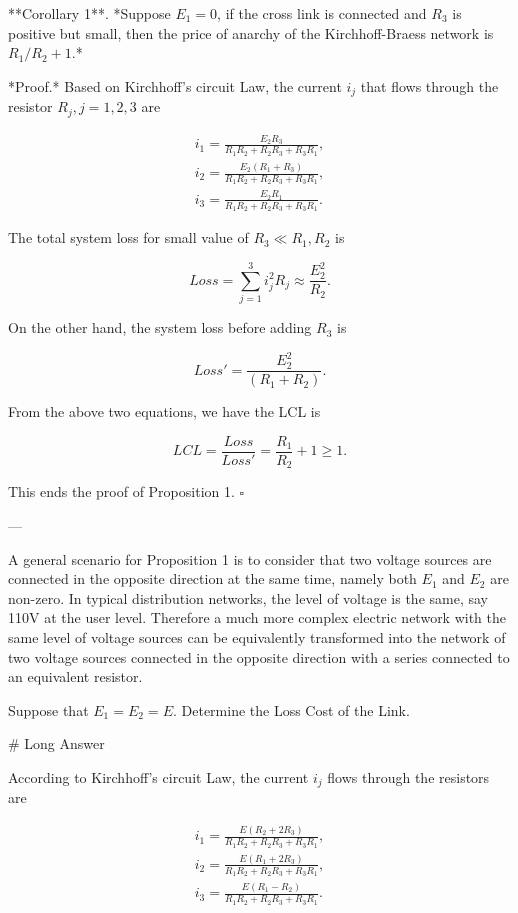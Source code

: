 **Corollary 1**. *Suppose $E_1=0$, if the cross link is connected and $R_3$ is positive but small, then the price of anarchy of the Kirchhoff-Braess network is $R_1/R_2 + 1.$*

*Proof.* Based on Kirchhoff's circuit Law, the current $i_j$ that flows through the resistor $R_j,j=1,2,3$ are

$$\begin{aligned} i_1 = \frac{E_2 R_3}{R_1R_2+R_2R_3+R_3R_1},\nonumber\\ i_2 = \frac{E_2 (R_1+R_3)}{R_1R_2+R_2R_3+R_3R_1},\nonumber\\ i_3 = \frac{E_2 R_1}{R_1R_2+R_2R_3+R_3R_1}.\nonumber \end{aligned}$$

The total system loss for small value of $R_3 \ll R_1,R_2$ is

$$Loss = \sum_{j=1}^{3} i_j^2R_j \approx \frac{E_2^2}{R_2}.$$

On the other hand, the system loss before adding $R_3$ is

$$Loss' = \frac{E_2^2}{(R_1+R_2)}.$$

From the above two equations, we have the LCL is

$$LCL = \frac{Loss}{Loss'} = \frac{R_1}{R_2} + 1 \geq 1.$$

This ends the proof of Proposition 1. $\square$

---

A general scenario for Proposition 1 is to consider that two voltage sources are connected in the opposite direction at the same time, namely both $E_1$ and $E_2$ are non-zero. In typical distribution networks, the level of voltage is the same, say 110V at the user level. Therefore a much more complex electric network with the same level of voltage sources can be equivalently transformed into the network of two voltage sources connected in the opposite direction with a series connected to an equivalent resistor.

Suppose that $E_1 = E_2 = E$. Determine the Loss Cost of the Link.

# Long Answer

According to Kirchhoff's circuit Law, the current $i_j$ flows through the resistors are

$$\begin{aligned}
    i_1 = \frac{E (R_2+2R_3)}{R_1R_2+R_2R_3+R_3R_1},\nonumber\\
    i_2 = \frac{E (R_1+2R_3)}{R_1R_2+R_2R_3+R_3R_1},\nonumber\\
    i_3 = \frac{E (R_1-R_2)}{R_1R_2+R_2R_3+R_3R_1}.\nonumber \end{aligned}$$

